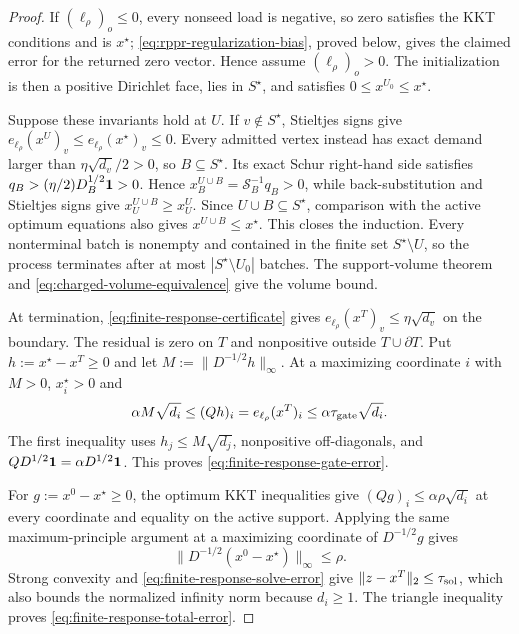 \begin{proof}
If $(\ell_\rho)_o\leq0$, every nonseed load is negative, so zero satisfies
the KKT conditions and is $x^\star$; \cref{eq:rppr-regularization-bias},
proved below, gives the claimed error for the returned zero vector.  Hence
assume $(\ell_\rho)_o>0$.  The initialization is then a positive Dirichlet
face, lies in $S^\star$, and satisfies $0\leq x^{U_0}\leq x^\star$.

Suppose these invariants hold at $U$.  If $v\notin S^\star$, Stieltjes signs
give
$e_{\ell_\rho}(x^U)_v\leq e_{\ell_\rho}(x^\star)_v\leq0$.
Every admitted vertex instead has exact demand larger than
$\eta\sqrt{d_v}/2>0$, so $B\subseteq S^\star$.  Its exact Schur right-hand
side satisfies $q_B>(\eta/2)D_B^{1/2}\mathbf{1}>0$.  Hence
$x_B^{U\cup B}=\mathcal S_B^{-1}q_B>0$, while back-substitution and
Stieltjes signs give $x_U^{U\cup B}\geq x_U^U$.  Since
$U\cup B\subseteq S^\star$, comparison with the active optimum equations
also gives $x^{U\cup B}\leq x^\star$.  This closes the induction.  Every
nonterminal batch is nonempty and contained in the finite set
$S^\star\setminus U$, so the process terminates after at most
$|S^\star\setminus U_0|$ batches.  The support-volume theorem and
\cref{eq:charged-volume-equivalence} give the volume bound.

At termination, \cref{eq:finite-response-certificate} gives
$e_{\ell_\rho}(x^T)_v\leq\eta\sqrt{d_v}$ on the boundary.  The residual is
zero on $T$ and nonpositive outside $T\cup\partial T$.  Put
$h:=x^\star-x^T\geq0$ and let
$M:=\|D^{-1/2}h\|_\infty$.  At a maximizing coordinate $i$ with $M>0$,
$x_i^\star>0$ and
\begin{equation}
 \alpha M\sqrt{d_i}
 \leq(Qh)_i=e_{\ell_\rho}(x^T)_i
 \leq\alpha\tau_{\rm gate}\sqrt{d_i}.
 \label{eq:finite-response-maximum-principle}
\end{equation}
The first inequality uses $h_j\leq M\sqrt{d_j}$, nonpositive
off-diagonals, and $QD^{1/2}\mathbf{1}=\alpha D^{1/2}\mathbf{1}$.  This proves
\cref{eq:finite-response-gate-error}.

For $g:=x^0-x^\star\geq0$, the optimum KKT inequalities give
$(Qg)_i\leq\alpha\rho\sqrt{d_i}$ at every coordinate and equality on the
active support.  Applying the same maximum-principle argument at a maximizing
coordinate of $D^{-1/2}g$ gives
\begin{equation}
 \|D^{-1/2}(x^0-x^\star)\|_\infty\leq\rho.
 \label{eq:rppr-regularization-bias}
\end{equation}
Strong convexity and \cref{eq:finite-response-solve-error} give
$\|z-x^T\|_2\leq\tau_{\rm sol}$, which also bounds the normalized infinity
norm because $d_i\geq1$.  The triangle inequality proves
\cref{eq:finite-response-total-error}.


\end{proof}
